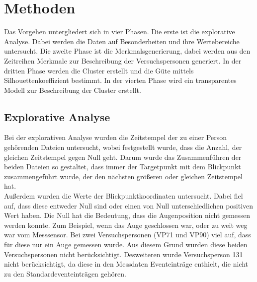 \documentclass[12pt]{article}
\begin{document}
\section*{Methoden}
Das Vorgehen untergliedert sich in vier Phasen. Die erste ist die explorative Analyse. Dabei werden die Daten auf Besonderheiten und ihre Wertebereiche untersucht. Die zweite Phase ist die Merkmalsgenerierung, dabei werden aus den Zeitreihen Merkmale zur Beschreibung der Versuchspersonen generiert. In der dritten Phase werden die Cluster erstellt und die G\"ute mittels Silhouettenkoeffizient bestimmt. In der vierten Phase wird ein transparentes Modell zur Beschreibung der Cluster erstellt.

\subsection*{Explorative Analyse}
Bei der explorativen Analyse wurden die Zeitstempel der zu einer Person geh\"orenden Dateien untersucht, wobei festgestellt wurde, dass die Anzahl, der gleichen Zeitstempel gegen Null geht. Darum wurde das Zusammenf\"uhren der beiden Dateien so gestaltet, dass immer der Targetpunkt mit dem Blickpunkt zusammengef\"uhrt wurde, der den n\"achsten gr\"o\ss{}eren oder gleichen Zeitstempel hat.\\
Au\ss{}erdem wurden die Werte der Blickpunktkoordinaten untersucht. Dabei fiel auf, dass diese entweder Null sind oder einen von Null unterschiedlichen positiven Wert haben. Die Null hat die Bedeutung, dass die Augenposition nicht gemessen werden konnte. Zum Beispiel, wenn das Auge geschlossen war, oder zu weit weg war vom Messsensor. Bei zwei Versuchspersonen (VP71 und VP90) viel auf, dass f\"ur diese nur ein Auge gemessen wurde. Aus diesem Grund wurden diese beiden Versuchspersonen nicht ber\"ucksichtigt. Desweiteren wurde Versuchsperson 131 nicht ber\"ucksichtigt, da diese in den Messdaten Eventeintr\"age enthielt, die nicht zu den Standardeventeintr\"agen geh\"oren.
\end{document}
